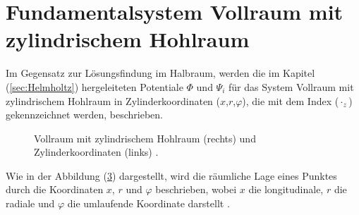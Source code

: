 \section{Fundamentalsystem Vollraum mit zylindrischem Hohlraum}
\label{sec:Zylinder}

Im Gegensatz zur Lösungsfindung im Halbraum, werden die im Kapitel (\ref{sec:Helmholtz}) hergeleiteten Potentiale $\Phi$ und $\Psi_{i}$ für das System Vollraum mit zylindrischem Hohlraum in Zylinderkoordinaten ($x$,$r$,$\varphi$), die mit dem Index ($\cdot_z$) gekennzeichnet werden, beschrieben.
\begin{figure}[H]
	\centering
	\begin{subfigure}[t]{0.48\textwidth}
		\hspace*{25mm}
		\centering
		
		\label{fig:cyl_a}
	\end{subfigure}\hfill
	\begin{subfigure}[t]{0.48\textwidth}
		\centering
			\hspace*{-7mm}
		
		\label{fig:cyl_b}
	\end{subfigure}
	\caption{Vollraum mit zylindrischem Hohlraum (rechts) und Zylinderkoordinaten (links) \citep{Freisinger2022}.}
	\label{fig:cyl_pair}
\end{figure}


Wie in der Abbildung (\ref{fig:cyl_pair}) dargestellt, wird die räumliche Lage eines Punktes durch die Koordinaten $x$, $r$ und $\varphi$ beschrieben, wobei \(x\) die longitudinale, \(r\) die radiale und \(\varphi\) die umlaufende Koordinate darstellt \citep{Freisinger2022}.


